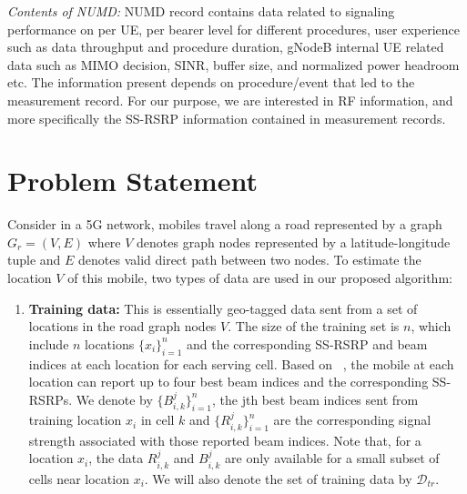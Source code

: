 \documentclass[conference, 10pt]{IEEEtran}
\begin{document}
\begin{NoHyper}
{\em Contents of NUMD:} NUMD record contains data related to signaling performance on
per UE, per bearer level for different procedures, user experience such as data
throughput and procedure duration, gNodeB internal UE related data such as MIMO
decision, SINR, buffer size, and normalized power headroom etc.  The information
present depends on procedure/event that led to the measurement record. For our
purpose, we are interested in RF information, and more specifically the SS-RSRP information contained in measurement records. 
%
%
%
%
%





\section{Problem Statement} 
\label{sec:ps}

Consider in a 5G network, mobiles travel along a road represented by a graph $G_r=(V,E)$ where $V$
denotes graph nodes represented by a latitude-longitude tuple and $E$ denotes
valid direct path between two nodes. To estimate the location $V$ of this mobile, two types of data
are used in our proposed algorithm:

\begin{enumerate}

\item \textbf{Training data:} This is essentially geo-tagged data sent from
a set of locations in the road graph nodes $V$. The size of the training set is $n$, which include $n$ locations
$\{x_i\}_{i=1}^n$ and the corresponding SS-RSRP and beam indices at each location for each serving cell. Based on ~\cite{5GTF}, 
the mobile at each location can report up to four best beam indices and the corresponding SS-RSRPs.
We denote by $\{B^{j}_{i,k}\}_{i=1}^n$, the jth best beam indices sent from training location $x_i$ in cell $k$ and $\{R^j_{i,k}\}_{i=1}^n$ are the corresponding signal strength 
associated with those reported beam indices. Note
that, for a location $x_i$, the data $R^j_{i,k}$  and $B^j_{i,k}$ are only available
for a small subset of cells near location $x_i$. We will also denote the set of
training data by $\mathcal{D}_{tr}$.


\end{enumerate}
\end{NoHyper}
\end{document}
